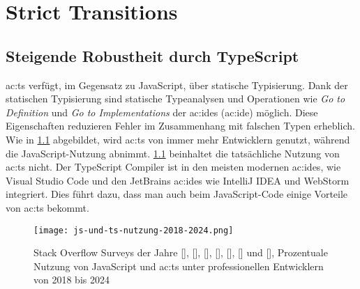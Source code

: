 \chapter{Strict Transitions} \label{ch:strict-transitions}

\section{Steigende Robustheit durch TypeScript}

\acrlong{ac:ts} verfügt, im Gegensatz zu JavaScript, über statische Typisierung. Dank der statischen Typisierung sind statische Typeanalysen und Operationen wie \textit{Go to Definition} und \textit{Go to Implementations} der \acrlong{ac:ide}s (\acrshort{ac:ide}) möglich. Diese Eigenschaften reduzieren Fehler im Zusammenhang mit falschen Typen erheblich. Wie in \ref{fig:js-und-ts-nutzung-2018-2024} abgebildet, wird \acrlong{ac:ts} von immer mehr Entwicklern genutzt, während die JavaScript-Nutzung abnimmt. \ref{fig:js-und-ts-nutzung-2018-2024} beinhaltet die tatsächliche Nutzung von \acrshort{ac:ts} nicht. Der TypeScript Compiler ist in den meisten modernen \acrshort{ac:ide}s, wie Visual Studio Code und den JetBrains \acrshort{ac:ide}s wie IntelliJ IDEA und WebStorm integriert. Dies führt dazu, dass man auch beim JavaScript-Code einige Vorteile von \acrlong{ac:ts} bekommt.\cite{typeScriptDocumentary}

\begin{figure}[H]
  \texttt{[image: js-und-ts-nutzung-2018-2024.png]}
  \caption{Stack Overflow Surveys der Jahre
  [\citeyear{stackOverflowSurvey2018MostPopularTechnologies}],
  [\citeyear{stackOverflowSurvey2019MostPopularTechnologies}],
  [\citeyear{stackOverflowSurvey2020MostPopularTechnologies}],
  [\citeyear{stackOverflowSurvey2021MostPopularTechnologies}],
  [\citeyear{stackOverflowSurvey2022MostPopularTechnologies}],
  [\citeyear{stackOverflowSurvey2023MostPopularTechnologies}] und
  [\citeyear{stackOverflowSurvey2024MostPopularTechnologies}], Prozentuale Nutzung von JavaScript und \acrlong{ac:ts} unter professionellen Entwicklern von 2018 bis 2024}
  \label{fig:js-und-ts-nutzung-2018-2024}
\end{figure}


